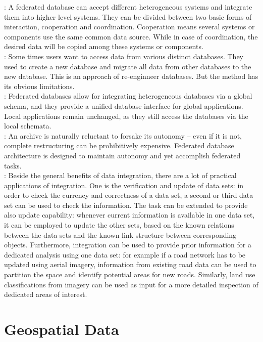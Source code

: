 \documentclass[12pt,a4paper]{report}
\begin{document}
	\citep{Jian}: A federated database can accept different heterogeneous systems and integrate them into higher level systems. They can be divided between two basic forms of interaction, cooperation and coordination. Cooperation means several systems or components use the same common data source. While in case of coordination, the desired data will be copied among these systems or components.
	\\

	\citep{Jian}: Some times users want to access data from various distinct databases. They used to create a new database and migrate all data from other databases to the new database. This is an approach of re-enginneer databases. But the method has its obvious limitations.
	\\

	\citep{Butenuth}: Federated databases allow for integrating heterogeneous databases via a global schema, and they provide a unified database interface for global applications. Local applications remain unchanged, as they still access the databases via the local schemata.
	\\

	\citep{Malik}: An archive is naturally reluctant to forsake its autonomy – even if it is not, complete restructuring can be prohibitively expensive. Federated database architecture is designed to maintain autonomy and yet accomplish federated tasks.
	\\

	\citep{Butenuth}: Beside the general benefits of data integration, there are a lot of practical applications of integration. One is the verification and update of data sets: in order to check the currency and correctness of a data set, a second or third data set can be used to check the information. The task can be extended to provide also update capability: whenever current information is available in one data set, it can be employed to update the other sets, based on the known relations between the data sets and the known link structure between corresponding objects. Furthermore, integration can be used to provide prior information for a dedicated analysis using one data set: for example if a road network has to be updated using aerial imagery, information from existing road data can be used to partition the space and identify potential areas for new roads. Similarly, land use classifications from imagery can be used as input for a more detailed inspection of dedicated areas of interest. 
	\\



	\section{Geospatial Data}
	\label{sec:fed_geodata:geodata}


	\renewcommand{\bibname}{References}
	
	
\end{document}
